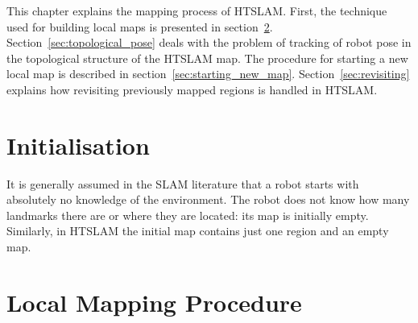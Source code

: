 This chapter explains the mapping process of HTSLAM. First, the
technique used for building local maps is presented in
section~\ref{sec:local_mapping}. Section~\ref{sec:topological_pose}
deals with the problem of tracking of robot pose in the topological
structure of the HTSLAM map. The procedure for starting a new local
map is described in section~\ref{sec:starting_new_map}.
Section~\ref{sec:revisiting} explains how revisiting previously
mapped regions is handled in HTSLAM.

\section{Initialisation}

It is generally assumed in the SLAM literature that a robot starts
with absolutely no knowledge of the environment. The robot does not
know how many landmarks there are or where they are located: its map
is initially empty. Similarly, in HTSLAM the initial map contains just
one region and an empty map.


\section{Local Mapping Procedure}
\label{sec:local_mapping}


